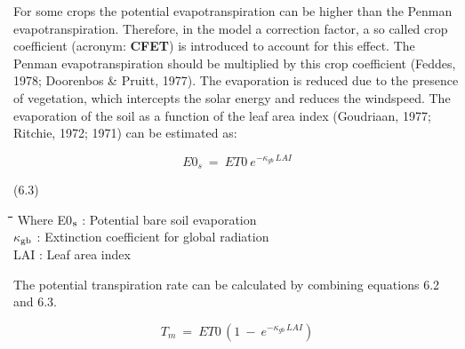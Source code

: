 \documentclass[11pt]{article}
\begin{document}
\bigskip
\bigskip
For some crops the potential evapotranspiration can be higher than the Penman evapotran\-spiration. Therefore, in the model a correction factor, a so called  crop coefficient
(acronym: {\bf CFET}) is introduced to account for this effect. The Penman evapotranspiration
should be multiplied by this crop coefficient (Feddes, 1978; Doorenbos \& Pruitt, 1977).
The evaporation is reduced due to the presence of vegetation, which intercepts the solar
energy and reduces the windspeed. The evaporation of the soil as a function of the leaf
area index (Goudriaan, 1977; Ritchie, 1972; 1971) can be estimated as:

\begin{displaymath}
E0 _{s} ~=~ ET0 ~e ^{-\kappa _{gb} \, LAI}
\end{displaymath}

 \bigskip
\strut\hfill (6.3)
\nwln
\begin{tabbing}
\hspace{1.27cm}\=\hspace{1.27cm}\=\hspace{1.27cm}\=\hspace{1.27cm}\=%
\hspace{1.27cm}\=\hspace{1.27cm}\=\hspace{1.27cm}\=\hspace{1.27cm}\=%
\hspace{1.27cm}\=\hspace{1.27cm}\=\kill
Where\> \> E0$_{{\rm s}}$\> : Potential bare soil evaporation\> \> \> \> \> \> \> [cm d$^{{\rm -1}}$]\\
\>\> $\kappa$$_{{\rm gb}}$\> : Extinction coefficient for global radiation\> \> \> \> \> \> \> [-]\\
\>\> LAI\> : Leaf area index\> \> \> \> \> \> \> [ha ha$^{{\rm -1}}$]
\end{tabbing}

 \bigskip
The potential transpiration rate can be calculated by combining equations 6.2 and 6.3.

\begin{displaymath}
T _{m} ~=~ ET0\, (1~-~e ^{-\kappa _{gb} \, LAI} )
\end{displaymath}
\end{document}
